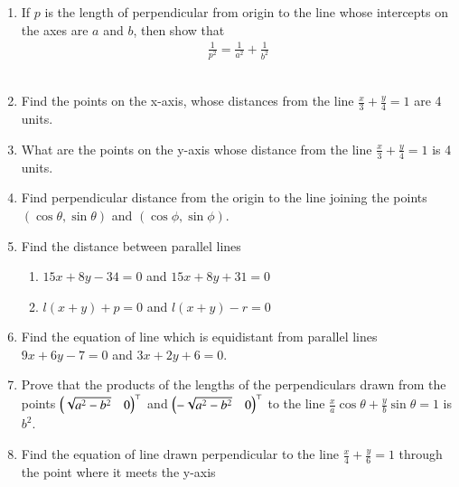 \begin{enumerate}[label=\thesubsection.\arabic*,ref=\thesubsection.\theenumi]
\label{chapters/11/10/3/17}
\\
\solution

\item If $p$ is the length of perpendicular from origin to the line whose intercepts on the axes are $a$ and $b$, then show that 
\begin{align}
	\frac{1}{p^2} = \frac{1}{a^2}+ \frac{1}{b^2}
\label{eq:11/10/3/18}
\end{align}
\label{chapters/11/10/3/18}
\\
\solution

\item Find the points on the x-axis, whose distances from the line $\frac{x}{3}+\frac{y}{4}=1$ are 4 units.
\label{chapters/11/10/3/5}
	\\
	\solution

\item What are the points on the y-axis whose distance from the line $\frac{x}{3}+\frac{y}{4}=1$ is 4 units.
\\
\solution
		
\item Find perpendicular distance from the origin to the line joining the points $(\cos\theta,\sin\theta)$ and $(\cos\phi,\sin\phi)$.
\\
\solution
		
\item Find the distance between parallel lines
\label{chapters/11/10/3/6}
\begin{enumerate}
	\item $15x+8y-34=0$ and  $15x+8y+31=0$ \\
	\item  $l(x+y)+p=0$ and  $l(x+y)-r=0$
\end{enumerate}
	\solution

\item Find the equation of line which is equidistant from parallel lines $9x+6y-7=0$ and $3x+2y+6=0$.
\\
\solution
		
	\item Prove that the products of the lengths of the perpendiculars drawn from the points $\begin{pmatrix}\sqrt{a^2-b^2}& 0\end{pmatrix}^{\top}$ and $\begin{pmatrix}-\sqrt{a^2-b^2} &0\end{pmatrix}^{\top}$ to the line $\frac{x}{a} \cos{\theta} + \frac{y}{b}\sin{\theta} =1 $ is $ b^2 $.
\\
    \solution 
		
\item Find the equation of line  drawn perpendicular to the line $\frac{x}{4}+\frac{y}{6}=1$ through the point where it meets the y-axis \\

\end{enumerate}
